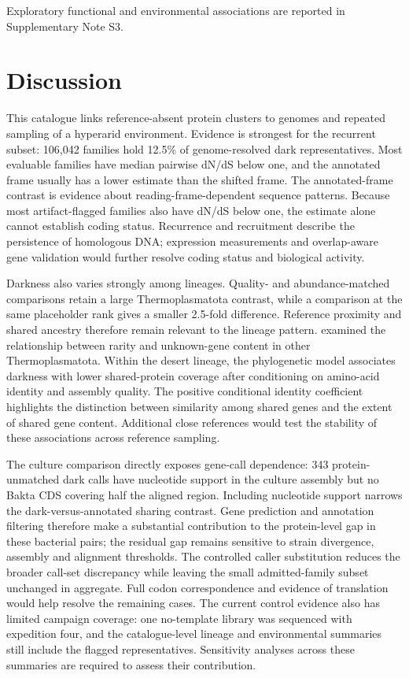 \documentclass[11pt]{article}
\begin{document}
Exploratory functional and environmental associations are reported in Supplementary Note S3.

\section*{Discussion}

This catalogue links reference-absent protein clusters to genomes and repeated sampling of a
hyperarid environment. Evidence is strongest for the recurrent subset: 106{,}042 families hold
12.5\% of genome-resolved dark representatives.
Most evaluable families have median pairwise dN/dS below one, and the annotated frame usually
has a lower estimate than the shifted frame. The annotated-frame contrast is evidence about reading-frame-dependent sequence patterns. Because most artifact-flagged families also have dN/dS below one, the estimate alone cannot establish coding status. Recurrence and recruitment describe the
persistence of homologous DNA; expression measurements and overlap-aware gene validation would further resolve coding status and biological activity.

Darkness also varies strongly among lineages. Quality- and abundance-matched comparisons
retain a large Thermoplasmatota contrast, while a comparison at the same placeholder rank gives
a smaller 2.5-fold difference. Reference proximity and shared ancestry therefore remain relevant
to the lineage pattern. \citet{maeke2025thermoplasmatota} examined the relationship between rarity
and unknown-gene content in other Thermoplasmatota. Within the desert lineage, the phylogenetic model associates darkness with lower shared-protein coverage after conditioning on amino-acid identity and assembly quality. The positive conditional identity coefficient highlights the distinction between similarity among shared genes and the extent of shared gene content. Additional close references would test the stability of these associations across reference sampling.

The culture comparison directly exposes gene-call dependence: 343 protein-unmatched dark calls have nucleotide support in the culture assembly but no Bakta CDS covering half the aligned region. Including nucleotide support narrows the dark-versus-annotated sharing contrast. Gene prediction and annotation filtering therefore make a substantial contribution to the protein-level gap in these bacterial pairs; the residual gap remains sensitive to strain divergence, assembly and alignment thresholds. The controlled caller substitution reduces the broader call-set discrepancy while leaving the small admitted-family subset unchanged in aggregate. Full codon correspondence and evidence of translation would help resolve the remaining cases. The current control evidence also has limited campaign
coverage: one no-template library was sequenced with expedition four, and the catalogue-level
lineage and environmental summaries still include the flagged representatives. Sensitivity
analyses across these summaries are required to assess their contribution.
\end{document}
